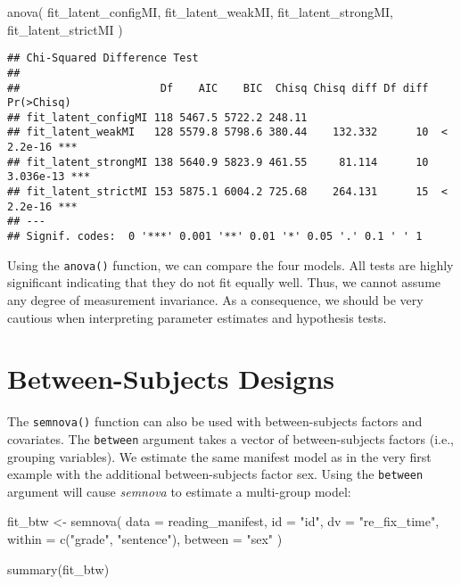 \documentclass[
]{book}
\newenvironment{Shaded}{\begin{snugshade}}{\end{snugshade}}
\newcommand{\AttributeTok}[1]{\textcolor[rgb]{0.77,0.63,0.00}{#1}}
\newcommand{\FunctionTok}[1]{\textcolor[rgb]{0.00,0.00,0.00}{#1}}
\newcommand{\NormalTok}[1]{#1}
\newcommand{\OtherTok}[1]{\textcolor[rgb]{0.56,0.35,0.01}{#1}}
\newcommand{\StringTok}[1]{\textcolor[rgb]{0.31,0.60,0.02}{#1}}
\begin{document}
\begin{Shaded}
\begin{Highlighting}[]
\FunctionTok{anova}\NormalTok{(}
\NormalTok{    fit\_latent\_configMI, }
\NormalTok{    fit\_latent\_weakMI, }
\NormalTok{    fit\_latent\_strongMI, }
\NormalTok{    fit\_latent\_strictMI}
\NormalTok{)}
\end{Highlighting}
\end{Shaded}

\begin{verbatim}
## Chi-Squared Difference Test
## 
##                      Df    AIC    BIC  Chisq Chisq diff Df diff Pr(>Chisq)    
## fit_latent_configMI 118 5467.5 5722.2 248.11                                  
## fit_latent_weakMI   128 5579.8 5798.6 380.44    132.332      10  < 2.2e-16 ***
## fit_latent_strongMI 138 5640.9 5823.9 461.55     81.114      10  3.036e-13 ***
## fit_latent_strictMI 153 5875.1 6004.2 725.68    264.131      15  < 2.2e-16 ***
## ---
## Signif. codes:  0 '***' 0.001 '**' 0.01 '*' 0.05 '.' 0.1 ' ' 1
\end{verbatim}

Using the \texttt{anova()} function, we can compare the four models. All tests are highly significant indicating that they do not fit equally well. Thus, we cannot assume any degree of measurement invariance. As a consequence, we should be very cautious when interpreting parameter estimates and hypothesis tests.

\hypertarget{between-subjects-designs}{%
\chapter{Between-Subjects Designs}\label{between-subjects-designs}}

The \texttt{semnova()} function can also be used with between-subjects factors and covariates. The \texttt{between} argument takes a vector of between-subjects factors (i.e., grouping variables). We estimate the same manifest model as in the very first example with the additional between-subjects factor sex. Using the \texttt{between} argument will cause \emph{semnova} to estimate a multi-group model:

\begin{Shaded}
\begin{Highlighting}[]
\NormalTok{fit\_btw }\OtherTok{\textless{}{-}} \FunctionTok{semnova}\NormalTok{(}
    \AttributeTok{data =}\NormalTok{ reading\_manifest,}
    \AttributeTok{id =} \StringTok{"id"}\NormalTok{, }
    \AttributeTok{dv =} \StringTok{"re\_fix\_time"}\NormalTok{,}
    \AttributeTok{within =} \FunctionTok{c}\NormalTok{(}\StringTok{"grade"}\NormalTok{, }\StringTok{"sentence"}\NormalTok{),}
    \AttributeTok{between =} \StringTok{"sex"}
\NormalTok{)}

\FunctionTok{summary}\NormalTok{(fit\_btw)}
\end{Highlighting}
\end{Shaded}
\end{document}
